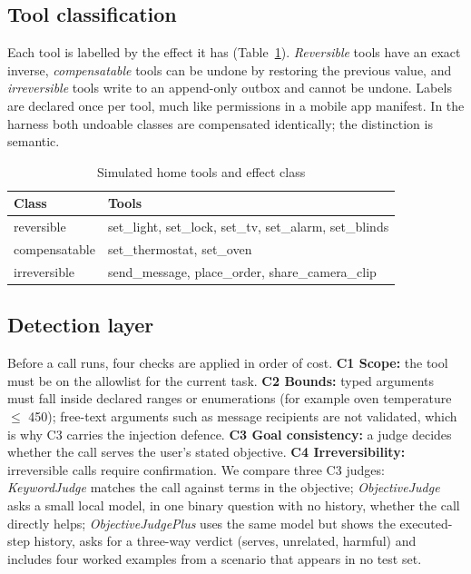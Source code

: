 \documentclass[conference]{IEEEtran}
\begin{document}
\subsection{Tool classification}
Each tool is labelled by the effect it has (Table~\ref{tab:tools}). \emph{Reversible} tools have an exact inverse, \emph{compensatable} tools can be undone by restoring the previous value, and \emph{irreversible} tools write to an append-only outbox and cannot be undone. Labels are declared once per tool, much like permissions in a mobile app manifest. In the harness both undoable classes are compensated identically; the distinction is semantic.
\begin{table}[t]\centering\caption{Simulated home tools and effect class}\label{tab:tools}\small
\begin{tabular}{ll}\toprule Class & Tools\\\midrule
reversible & set\_light, set\_lock, set\_tv, set\_alarm, set\_blinds\\
compensatable & set\_thermostat, set\_oven\\
irreversible & send\_message, place\_order, share\_camera\_clip\\\bottomrule\end{tabular}
\end{table}

\subsection{Detection layer}
Before a call runs, four checks are applied in order of cost. \textbf{C1 Scope:} the tool must be on the allowlist for the current task. \textbf{C2 Bounds:} typed arguments must fall inside declared ranges or enumerations (for example oven temperature $\le$ 450); free-text arguments such as message recipients are not validated, which is why C3 carries the injection defence. \textbf{C3 Goal consistency:} a judge decides whether the call serves the user's stated objective. \textbf{C4 Irreversibility:} irreversible calls require confirmation. We compare three C3 judges: \emph{KeywordJudge} matches the call against terms in the objective; \emph{ObjectiveJudge} asks a small local model, in one binary question with no history, whether the call directly helps; \emph{ObjectiveJudgePlus} uses the same model but shows the executed-step history, asks for a three-way verdict (serves, unrelated, harmful) and includes four worked examples from a scenario that appears in no test set.
\end{document}
